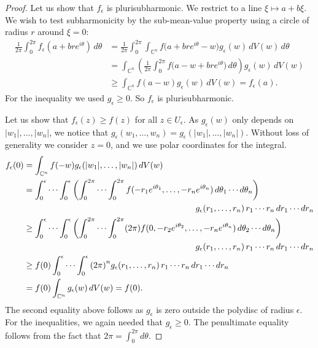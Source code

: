 \documentclass[12pt,openany]{book}
\newcommand{\sabs}[1]{\lvert {#1} \rvert}
\newcommand{\C}{{\mathbb{C}}}
\theoremstyle{plain}
\theoremstyle{remark}
\theoremstyle{definition}
\theoremstyle{exercise}
\theoremstyle{example}
\begin{document}
\begin{proof}
Let us show that $f_\epsilon$ is plurisubharmonic.  We restrict to a
line $\xi \mapsto a+b\xi$.
We wish to test subharmonicity by the sub-mean-value property using a circle
of radius $r$ around $\xi = 0$:
\begin{equation*}
\begin{split}
\frac{1}{2\pi} \int_0^{2\pi} f_\epsilon(a+bre^{i\theta})\, d\theta & =
\frac{1}{2\pi} \int_0^{2\pi}
\int_{\C^n}
f\bigl(a+bre^{i\theta}-w\bigr) g_\epsilon (w) \, dV(w) 
\,d\theta
\\
& =
\int_{\C^n}
\left(
\frac{1}{2\pi} \int_0^{2\pi}
f\bigl(a-w+bre^{i\theta}\bigr) \, d\theta \right) g_\epsilon (w) \, dV(w) 
\\
& \geq 
\int_{\C^n}
f(a-w) g_\epsilon (w) \, dV(w)  = f_\epsilon(a).
\end{split}
\end{equation*}
For the inequality we used $g_\epsilon \geq 0$.
So $f_\epsilon$ is plurisubharmonic.

Let us show that $f_\epsilon(z) \geq f(z)$ for all $z \in U_\epsilon$.
As $g_\epsilon(w)$ only depends on $\sabs{w_1},\ldots,\sabs{w_n}$, we notice
that
$g_\epsilon(w_1,\ldots,w_n) =
g_\epsilon(\sabs{w_1},\ldots,\sabs{w_n})$.
Without loss of generality we consider $z=0$, and we use polar coordinates
for the integral.
\pagebreak[1]
\begin{equation*}
\begin{split}
f_\epsilon(0)
& =
\int_{\C^n} f(-w) g_\epsilon (\sabs{w_1},\ldots,\sabs{w_n})
\, dV(w)
\\
& =
\int_0^\epsilon \cdots
\int_0^\epsilon
\left(
\int_0^{2\pi}
\cdots
\int_0^{2\pi}
 f(-r_1e^{i\theta_1},\ldots,
-r_ne^{i\theta_n}) \,
d\theta_1 \cdots d\theta_n \right)
\\
& \hspace{2.8in}
g_\epsilon (r_1,\ldots,r_n) \,
 r_1 \cdots r_n \,d r_1 \cdots d r_n
\\
& \geq
\int_0^\epsilon \cdots
\int_0^\epsilon
\left(
\int_0^{2\pi}
\cdots
\int_0^{2\pi}
(2\pi)
 f(0,-r_2e^{i\theta_2},\ldots,
-r_ne^{i\theta_n}) \,
d\theta_2 \cdots d\theta_n \right)
\\
& \hspace{2.8in}
g_\epsilon (r_1,\ldots,r_n) \,
 r_1 \cdots r_n \,d r_1 \cdots d r_n
\\
& \geq
f(0)
\int_0^\epsilon \cdots
\int_0^\epsilon
{(2\pi)}^n
g_\epsilon (r_1,\ldots,r_n) \,
 r_1 \cdots r_n \,d r_1 \cdots d r_n
\\
& = f(0) \int_{\C^n} g_\epsilon (w) \, dV(w)
= f(0) .
\end{split}
\end{equation*}
The second equality above
follows as $g_\epsilon$ is zero
outside the polydisc of radius $\epsilon$.
For the inequalities, we again needed that $g_\epsilon \geq 0$.
The penultimate equality follows from the fact that
$2\pi = \int_0^{2\pi}d \theta$.


\end{proof}
\end{document}
